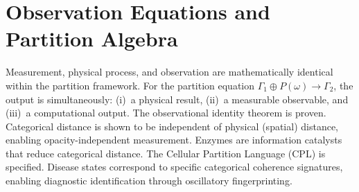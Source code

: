 \chapter{Observation Equations and Partition Algebra}
\label{ch:observation_equations}


\begin{chapterabstract}
Measurement, physical process, and observation are mathematically identical within the partition framework. For the partition equation $\Gamma_1 \oplus P(\omega) \to \Gamma_2$, the output is simultaneously: (i)~a physical result, (ii)~a measurable observable, and (iii)~a computational output. The observational identity theorem is proven. Categorical distance is shown to be independent of physical (spatial) distance, enabling opacity-independent measurement. Enzymes are information catalysts that reduce categorical distance. The Cellular Partition Language (CPL) is specified. Disease states correspond to specific categorical coherence signatures, enabling diagnostic identification through oscillatory fingerprinting.
\end{chapterabstract}


